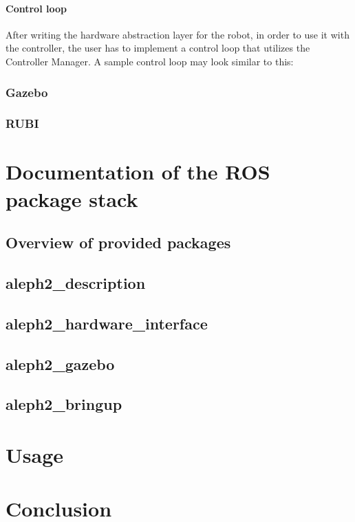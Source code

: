 \documentclass[english,inz,shortabstract]{iithesis}
\begin{document}
    \subsubsection{Control loop}
    After writing the hardware abstraction layer for the robot, in order to use it with the controller, the user has to implement a control loop that utilizes the Controller Manager. A sample control loop may look similar to this:

    

    \subsection{Gazebo}

    \subsection{RUBI}


\chapter{Documentation of the ROS package stack}

\section{Overview of provided packages}

\section{aleph2\_description}

\section{aleph2\_hardware\_interface}

\section{aleph2\_gazebo}

\section{aleph2\_bringup}

\chapter{Usage}

\chapter{Conclusion}



\end{document}
